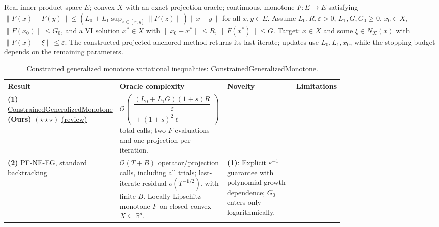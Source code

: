 \begin{table}[tp]
\centering
\caption{Constrained generalized monotone variational inequalities: \href{https://github.com/k3nfalt/longtails/blob/main/LongTails/Setups/ConstrainedGeneralizedMonotone.lean}{ConstrainedGeneralizedMonotone}.}\label{tab:ConstrainedGeneralizedMonotone}
\parbox{\linewidth}{\footnotesize Real inner-product space $E$; convex $X$ with an exact projection oracle; continuous, monotone $F:E\to E$ satisfying $\|F(x)-F(y)\|\le (L_0+L_1\sup_{z\in[x,y]}\|F(z)\|)\|x-y\|$ for all $x,y\in E$. Assume $L_0,R,\varepsilon>0$, $L_1,G,G_0\ge0$, $x_0\in X$, $\|F(x_0)\|\le G_0$, and a VI solution $x^*\in X$ with $\|x_0-x^*\|\le R$, $\|F(x^*)\|\le G$. Target: $x\in X$ and some $\xi\in N_X(x)$ with $\|F(x)+\xi\|\le\varepsilon$. The constructed projected anchored method returns its last iterate; updates use $L_0,L_1,x_0$, while the stopping budget depends on the remaining parameters.}\par\smallskip
\begin{threeparttable}
\footnotesize
\setlength{\tabcolsep}{4pt}\renewcommand{\arraystretch}{1.25}
\begin{tabularx}{\linewidth}{@{}>{\raggedright\arraybackslash}p{0.20\linewidth}>{\raggedright\arraybackslash}p{0.32\linewidth}>{\raggedright\arraybackslash}p{0.25\linewidth}>{\raggedright\arraybackslash}X@{}}
\toprule
\textbf{Result} & \textbf{Oracle complexity} & \textbf{Novelty} & \textbf{Limitations} \\
\midrule
\textbf{(1)} \href{https://github.com/k3nfalt/longtails/blob/main/LongTails/Theorems/ConstrainedGeneralizedMonotone.lean}{Constrained\allowbreak{}Generalized\allowbreak{}Monotone} \textbf{(Ours)} $(\star\star\star)$ \href{https://github.com/k3nfalt/longtails/blob/main/scripts/reviews/ConstrainedGeneralizedMonotone.md}{(review)}
& $\mathcal{O}\!\left(\begin{gathered}\dfrac{(L_0+L_1G)(1+s)R}{\varepsilon}\\{}+(1+s)^2\ell\end{gathered}\right)$ total calls; two $F$ evaluations and one projection per iteration.
& & \\
\midrule[1.2pt]
\textbf{(2)} PF-NE-EG, standard backtracking \citep[App.~A, Lem.~10]{cgmShen2026v2}
& $\mathcal{O}(T+B)$ operator/projection calls, including all trials; last-iterate residual $o(T^{-1/2})$, with finite $B$. Locally Lipschitz monotone $F$ on closed convex $X\subseteq\mathbb R^d$.
& \textbf{(1)}: Explicit $\varepsilon^{-1}$ guarantee with polynomial growth dependence; $G_0$ enters only logarithmically.

\end{tabularx}
\end{threeparttable}
\end{table}
